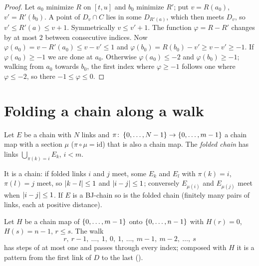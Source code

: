 \begin{proof}
Let $a_0$ minimize $R$ on $[t,u]$ and $b_0$ minimize $R'$; put $v=R(a_0)$, $v'=R'(b_0)$. A point of $D_v\cap C$ lies in some $D_{R'(a)}$, which then meets $D_v$,
so $v'\le R'(a)\le v+1$. Symmetrically $v\le v'+1$. The function $\varphi=R-R'$ changes by at most $2$ between consecutive indices. Now $\varphi(a_0)=v-R'(a_0)\le
v-v'\le1$ and $\varphi(b_0)=R(b_0)-v'\ge v-v'\ge-1$. If $\varphi(a_0)\ge-1$ we are done at $a_0$. Otherwise $\varphi(a_0)\le-2$ and $\varphi(b_0)\ge-1$; walking
from $a_0$ towards $b_0$, the first index where $\varphi\ge-1$ follows one where $\varphi\le-2$, so there $-1\le\varphi\le0$.
\end{proof}


\section{Folding a chain along a walk}

\begin{definition}\label{def:fold}
Let $E$ be a chain with $N$ links and $\pi\colon\left\{ 0,\dots,N-1 \right\}\to\left\{ 0,\dots,m-1 \right\}$ a chain map with a section $\mu$ ($\pi\circ\mu=\mathrm{id}$) that is
also a chain map. The \emph{folded chain} has links $\bigcup_{\pi(k)=i}E_k$, $i<m$.
\end{definition}

It is a chain: if folded links $i$ and $j$ meet, some $E_k$ and $E_l$ with $\pi(k)=i$, $\pi(l)=j$ meet, so $\left\lvert k-l\right\rvert\le1$ and $\left\lvert i-j\right\rvert\le1$; conversely
$E_{\mu(i)}$ and $E_{\mu(j)}$ meet when $\left\lvert i-j\right\rvert\le1$. If $E$ is a BJ-chain so is the folded chain (finitely many pairs of links, each at positive
distance).


\begin{lemma}\label{lem:unfold}
Let $H$ be a chain map of $\left\{ 0,\dots,m-1 \right\}$ onto $\left\{ 0,\dots,n-1 \right\}$ with $H(r)=0$, $H(s)=n-1$, $r\le s$. The walk
\[
r,\ r-1,\ \dots,\ 1,\ 0,\ 1,\ \dots,\ m-1,\ m-2,\ \dots,\ s
\]
has steps of at most one and passes through every index; composed with $H$ it is a pattern from the first link of $D$ to the last ().
\end{lemma}


